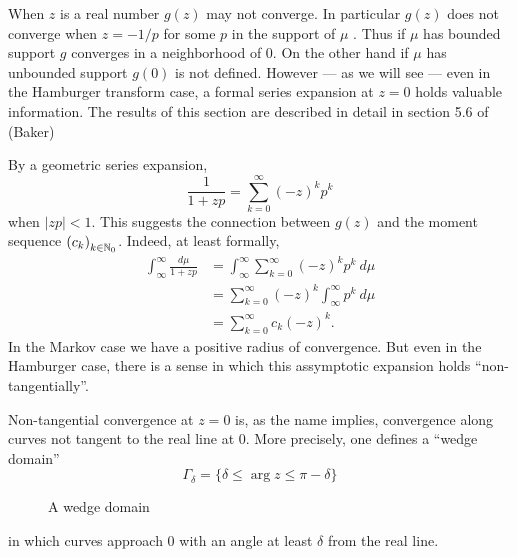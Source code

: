 When $z$ is a real number $g(z)$ may not converge. In particular $g(z)$ does not converge when $z = -1/p$ for some $p$ in the support of $\mu$ \pn.  Thus if $\mu$ has bounded support $g$ converges in a neighborhood of $0$. On the other hand if $\mu$ has unbounded support $g(0)$ is not defined. However — as we will see — even in the Hamburger transform case, a formal series expansion at $z = 0$ holds valuable information. The results of this section are described in detail in section 5.6 of (Baker) \cn

By a geometric series expansion,
\[
  \frac1{1 + zp} = \sum_{k = 0}^\infty {(-z)}^k p^k 
\]
when $|zp| < 1$. This suggests the connection between $g(z)$ and the moment sequence ${(c_k)}_{k \in \mathbb{N}_0}$. Indeed, at least formally,
\begin{align*}
  \int_\infty^\infty\frac{d\mu}{1+zp}
  &= \int_\infty^\infty \sum_{k = 0}^\infty {(-z)}^k p^k ~d\mu \\
  &= \sum_{k = 0}^\infty {(-z)}^k \int_\infty^\infty p^k ~d\mu \\
  &= \sum_{k = 0}^\infty c_k{(-z)}^k.
\end{align*}
In the Markov case we have a positive radius of convergence. But even in the Hamburger case, there is a sense in which this assymptotic expansion holds ``non-tangentially''.

Non-tangential convergence at $z = 0$ is, as the name implies, convergence along curves not tangent to the real line at $0$. More precisely, one defines a ``wedge domain''
\[
  \Gamma_\delta = \{\delta \leq \arg z \leq \pi - \delta\}
\]
\begin{figure}
  \centering
  \caption{A wedge domain}\label{fig:wedge}
\end{figure}
in which curves approach $0$ with an angle at least $\delta$ from the real line.

